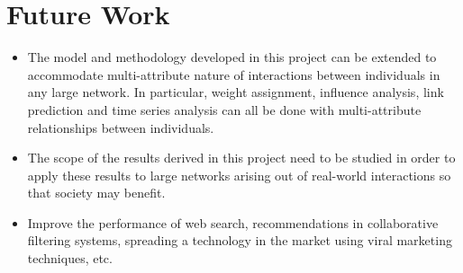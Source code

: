 \section{Future Work}

\begin{itemize}
\item The model and methodology developed in this project can be extended to accommodate multi-attribute nature of interactions between individuals in any large network. In particular, weight assignment, influence analysis, link prediction and time series analysis can all be done with multi-attribute relationships between individuals.

\item The scope of the results derived in this project need to be studied in order to apply these results to large networks arising out of real-world interactions so that society may benefit. 

\item Improve the performance of web search, recommendations in collaborative filtering systems, spreading a technology in the market using viral marketing techniques, etc. 
\end{itemize}






